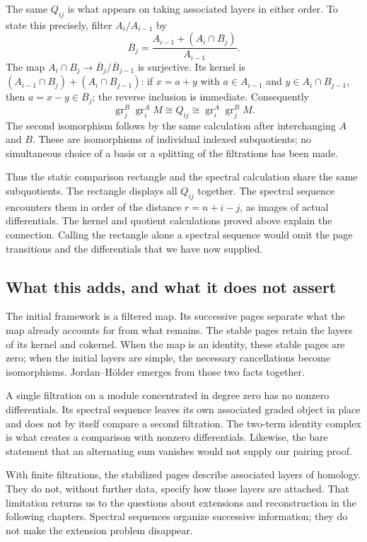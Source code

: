 The same $Q_{ij}$ is what appears on taking associated layers in either
order. To state this precisely, filter $A_i/A_{i-1}$ by
\[
\overline B_j=\frac{A_{i-1}+(A_i\cap B_j)}{A_{i-1}}.
\]
The map $A_i\cap B_j\to\overline B_j/\overline B_{j-1}$ is surjective.
Its kernel is
$(A_{i-1}\cap B_j)+(A_i\cap B_{j-1})$: if
$x=a+y$ with $a\in A_{i-1}$ and $y\in A_i\cap B_{j-1}$, then
$a=x-y\in B_j$; the reverse inclusion is immediate. Consequently
\[
\operatorname{gr}^{B}_j\operatorname{gr}^{A}_i M
\cong Q_{ij}
\cong\operatorname{gr}^{A}_i\operatorname{gr}^{B}_j M.
\]
The second isomorphism follows by the same calculation after interchanging
$A$ and $B$. These are isomorphisms of individual indexed subquotients;
no simultaneous choice of a basis or a splitting of the filtrations has
been made.

Thus the static comparison rectangle and the spectral calculation share
the same subquotients. The rectangle displays all $Q_{ij}$ together.
The spectral sequence encounters them in order of the distance
$r=n+i-j$, as images of actual differentials. The kernel and quotient
calculations proved above explain the connection. Calling the rectangle
alone a spectral sequence would omit the page transitions and the
differentials that we have now supplied.

\subsection{What this adds, and what it does not assert}

The initial framework is a filtered map. Its successive pages separate
what the map already accounts for from what remains. The stable pages
retain the layers of its kernel and cokernel. When the map is an identity,
these stable pages are zero; when the initial layers are simple, the
necessary cancellations become isomorphisms. Jordan--H\"older emerges
from those two facts together.

A single filtration on a module concentrated in degree zero has no
nonzero differentials. Its spectral sequence leaves its own associated
graded object in place and does not by itself compare a second
filtration. The two-term identity complex is what creates a comparison
with nonzero differentials. Likewise, the bare statement that an
alternating sum vanishes would not supply our pairing proof.

With finite filtrations, the stabilized pages describe associated
layers of homology. They do not, without further data, specify how those
layers are attached. That limitation returns us to the questions about
extensions and reconstruction in the following chapters. Spectral
sequences organize successive information; they do not make the extension
problem disappear.

